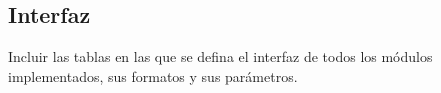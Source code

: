 \documentclass[parskip,a4paper,12pt]{article}
\newcommand{\fila}{}
\begin{document}
\subsection{Interfaz}
\begin{enunciado}{}{}%
Incluir las tablas en las que se defina el interfaz de todos los módulos implementados, sus formatos y sus parámetros. 
\end{enunciado}



\def\colUNO{2cm}
\def\colDOS{1cm}
\def\colTRES{2.0cm}
\def\colCUATRO{8cm}

\begin{table}[H]
    \caption{Interfaz del módulo  \emph{comp\_cic\_reg\_mux}}
    \label{tab:interfaz}
\gdef\cabecera{\fila{NOMBRE}{TIPO}{FORMATO}{DESCRIPCIÓN}}
\noindent\begin{mitabla}
\fila{}{}{}{} 
\fila{}{}{}{} 
\fila{}{}{}{} 
\fila{}{}{}{} 
\fila{}{}{}{} 
\fila{}{}{}{} 
\fila{}{}{}{} 
\fila{}{}{}{} 
\fila{}{}{}{} 
\fila{}{}{}{} 
\end{mitabla}
\end{table}

\begin{table}[H]
    \caption{Interfaz del módulo  \emph{comp\_cic\_mult\_add}}
    \label{tab:interfaz}
\gdef\cabecera{\fila{NOMBRE}{TIPO}{FORMATO}{DESCRIPCIÓN}}
\noindent\begin{mitabla}
\fila{}{}{}{} 
\fila{}{}{}{} 
\fila{}{}{}{} 
\fila{}{}{}{} 
\fila{}{}{}{} 
\fila{}{}{}{} 
\fila{}{}{}{} 
\fila{}{}{}{} 
\fila{}{}{}{} 
\fila{}{}{}{} 
\end{mitabla}
\end{table}

\begin{table}[H]
    \caption{Interfaz del módulo  \emph{comp\_cic\_rom}}
    \label{tab:interfaz}
\gdef\cabecera{\fila{NOMBRE}{TIPO}{FORMATO}{DESCRIPCIÓN}}
\noindent\begin{mitabla}
\fila{}{}{}{} 
\fila{}{}{}{} 
\fila{}{}{}{} 
\fila{}{}{}{} 
\fila{}{}{}{} 
\fila{}{}{}{} 
\fila{}{}{}{} 
\fila{}{}{}{} 
\fila{}{}{}{} 
\fila{}{}{}{} 
\end{mitabla}
\end{table}
\end{document}
